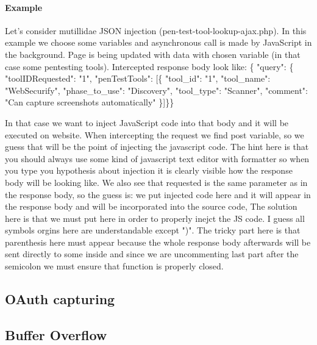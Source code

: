 \paragraph{Example}
Let's consider mutillidae JSON injection (pen-test-tool-lookup-ajax.php).
In this example we choose some variables and asynchronous call is made by JavaScript in the background.
Page is being updated with data with chosen variable (in that case some pentesting tools).
Intercepted response body look like: \newline
\{\newline
"query": \{\newline
"toolIDRequested": "1",\newline
"penTestTools": [\{\newline
"tool\_id": "1",\newline
"tool\_name": "WebSecurify",\newline
"phase\_to\_use": "Discovery",\newline
"tool\_type": "Scanner",\newline
"comment": "Can capture screenshots automatically"\newline
\}]\}\}

In that case we want to inject JavaScript code into that body and it will be executed on website.
When intercepting the request we find  post variable, so we guess that will be the point of injecting the javascript code.
The hint here is that you should always use some kind of javascript text editor with formatter so when you type you hypothesis about injection it is clearly visible how the response body will be looking like.
We also see that requested  is the same parameter as  in the response body, so the guess is: we put injected code here and it will appear in the response body and will be incorporated into the source code,
The solution here is that we must put  here in order to properly inejct the JS code.
I guess all symbols orgins here are understandable except ")".
The tricky part here is that parenthesis here must appear because the whole response body afterwards will be sent directly to some  inside  and since we are uncommenting last part after the semicolon we must ensure that function is properly closed.



\subsection{OAuth capturing}

\subsection{Buffer Overflow}
